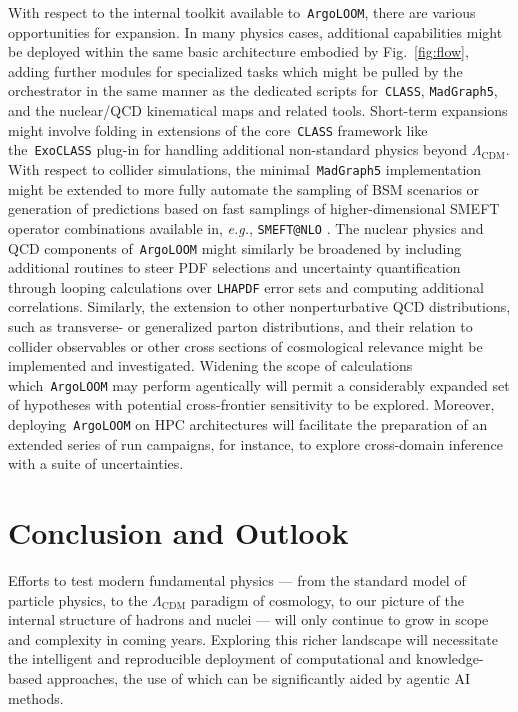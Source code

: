 \documentclass[final,3p,times,sort,compress]{elsarticle}
\newcommand{\AL}{\texttt{ArgoLOOM}\xspace}
\newcommand{\CLASS}{\texttt{CLASS}\xspace}
\newcommand{\MG}{\texttt{MadGraph5}\xspace}
\begin{document}
With respect to the internal toolkit available to~\AL, there are various opportunities for expansion.
%
In many physics cases, additional capabilities might be deployed within the same basic architecture embodied by Fig.~\ref{fig:flow}, adding further modules for specialized tasks which might be pulled by the orchestrator in the same manner as the dedicated scripts for~\CLASS, \MG, and the nuclear/QCD kinematical maps and related tools.
%
Short-term expansions might involve folding in extensions of the core~\CLASS framework like the~\texttt{ExoCLASS} plug-in for handling additional non-standard physics beyond $\Lambda_\mathrm{CDM}$.
%
With respect to collider simulations, the minimal~\MG implementation might be extended to more fully automate the sampling of BSM scenarios or generation of predictions based on fast samplings of higher-dimensional SMEFT operator combinations available in, {\it e.g.}, \texttt{SMEFT@NLO} \cite{Degrande:2020evl}.
%
The nuclear physics and QCD components of~\AL might similarly be broadened by including additional routines to steer PDF selections and uncertainty quantification through looping calculations over \texttt{LHAPDF} error sets and computing additional correlations.
%
Similarly, the extension to other nonperturbative QCD distributions, such as transverse- or generalized parton distributions, and their relation to collider observables or other cross sections of cosmological relevance might be implemented and investigated.
%
Widening the scope of calculations which~\AL may perform agentically will permit a considerably expanded set of hypotheses with potential cross-frontier sensitivity to be explored.
%
Moreover, deploying~\AL on HPC architectures will facilitate the preparation of an extended series of run campaigns, for instance, to explore cross-domain inference with a suite of uncertainties.


\section{Conclusion and Outlook}
\label{sec:conclusion}
%
%
Efforts to test modern fundamental physics --- from the standard model
of particle physics, to the $\Lambda_\mathrm{CDM}$ paradigm of cosmology,
to our picture of the internal structure of hadrons and nuclei --- will
only continue to grow in scope and complexity in coming years.
%
Exploring this richer landscape will necessitate the intelligent and
reproducible deployment of computational and knowledge-based approaches,
the use of which can be significantly aided by agentic AI methods.
%
\end{document}
